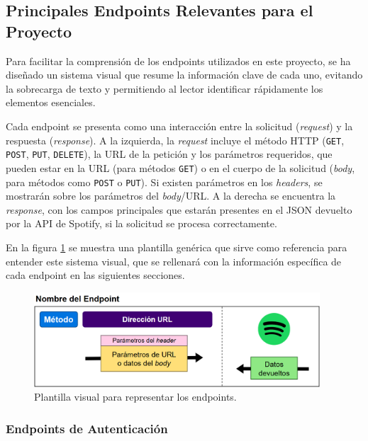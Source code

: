 \subsection{Principales Endpoints Relevantes para el Proyecto}

Para facilitar la comprensión de los endpoints utilizados en este proyecto, se ha diseñado un sistema visual que resume la información clave de cada uno, evitando la sobrecarga de texto y permitiendo al lector identificar rápidamente los elementos esenciales.

Cada endpoint se presenta como una interacción entre la solicitud (\textit{request}) y la respuesta (\textit{response}). A la izquierda, la \textit{request} incluye el método HTTP (\texttt{GET}, \texttt{POST}, \texttt{PUT}, \texttt{DELETE}), la URL de la petición y los parámetros requeridos, que pueden estar en la URL (para métodos \texttt{GET}) o en el cuerpo de la solicitud (\textit{body}, para métodos como \texttt{POST} o \texttt{PUT}). Si existen parámetros en los \textit{headers}, se mostrarán sobre los parámetros del \textit{body}/URL. A la derecha se encuentra la \textit{response}, con los campos principales que estarán presentes en el JSON devuelto por la API de Spotify, si la solicitud se procesa correctamente.

En la figura \ref{fig:plantilla_endpoints} se muestra una plantilla genérica que sirve como referencia para entender este sistema visual, que se rellenará con la información específica de cada endpoint en las siguientes secciones.

\begin{figure}[H]
    \centering
    \includegraphics[width=0.95\textwidth]{figures/endpoints/plantilla_endpoints.png}
    \caption{Plantilla visual para representar los endpoints.}
    \label{fig:plantilla_endpoints}
\end{figure}

\subsubsection{Endpoints de Autenticación}

